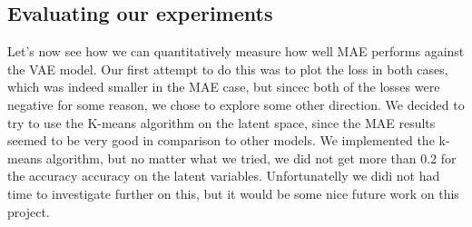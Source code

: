 \documentclass{article} %
\begin{document}
\subsection{Evaluating our experiments}
Let's now see how we can quantitatively measure how well MAE performs against
the VAE model. Our first attempt to do this was to plot the loss in both cases,
which was indeed smaller in the MAE case, but sincec both of the losses were
negative for some reason, we chose to explore some other direction. We decided
to try to use the K-means algorithm on the latent space, since the MAE results
seemed to be very good in comparison to other models. We implemented the
k-means algorithm, but no matter what we tried, we did not get more than 0.2 for
the accuracy accuracy on the latent variables. Unfortunatelly we didi not had
time to investigate further on this, but it would be some nice future work on
this project.
\end{document}
